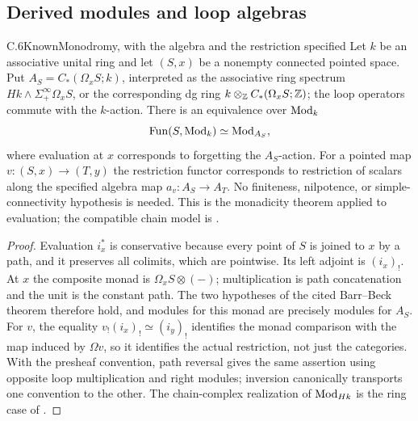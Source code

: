 \subsection{Derived modules and loop algebras}
\begin{claim}{C.6}{Known}{Monodromy, with the algebra and the restriction specified}
Let $k$ be an associative unital ring and let $(S,x)$ be a nonempty connected pointed space.  Put $A_S=C_*(\Omega_xS;k)$, interpreted as the associative ring spectrum $Hk\wedge\Sigma^\infty_+\Omega_xS$, or the corresponding dg ring $k\otimes_{\mathbb Z}C_*(\Omega_xS;\mathbb Z)$; the loop operators commute with the $k$-action.  There is an equivalence over $\operatorname{Mod}_k$
\[
 \operatorname{Fun}(S,\operatorname{Mod}_k)\simeq \operatorname{Mod}_{A_S},
\]
where evaluation at $x$ corresponds to forgetting the $A_S$-action.  For a pointed map $v:(S,x)\to(T,y)$ the restriction functor corresponds to restriction of scalars along the specified algebra map $a_v:A_S\to A_T$.  No finiteness, nilpotence, or simple-connectivity hypothesis is needed.  This is the monadicity theorem \citep[Theorem 4.7.3.5]{EF_LurieHA} applied to evaluation; the compatible chain model is \citet[Corollary 9.2]{C_RiveraZeinalian2018}.
\end{claim}
\begin{proof}
Evaluation $i_x^*$ is conservative because every point of $S$ is joined to $x$ by a path, and it preserves all colimits, which are pointwise.  Its left adjoint is $(i_x)_!$.  At $x$ the composite monad is $\Omega_xS\otimes(-)$; multiplication is path concatenation and the unit is the constant path.  The two hypotheses of the cited Barr--Beck theorem therefore hold, and modules for this monad are precisely modules for $A_S$.  For $v$, the equality $v_!(i_x)_!\simeq(i_y)_!$ identifies the monad comparison with the map induced by $\Omega v$, so it identifies the actual restriction, not just the categories.  With the presheaf convention, path reversal gives the same assertion using opposite loop multiplication and right modules; inversion canonically transports one convention to the other.  The chain-complex realization of $\operatorname{Mod}_{Hk}$ is the ring case of \citet[Theorem 5.1.6]{C_SchwedeShipley2003}.
\end{proof}

